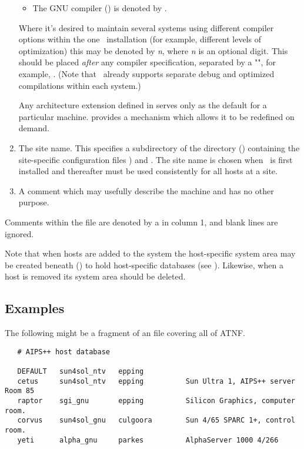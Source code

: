 \begin{enumerate}
\begin{itemize}
   \item
      The GNU compiler () is denoted by .

   \end{itemize}

   Where it's desired to maintain several systems using different compiler
   options within the one \aipspp\ installation (for example, different
   levels of optimization) this may be denoted by \textit{n}, where
   \textit{n} is an optional digit.  This should be placed {\em after} any
   compiler specification, separated by a "\code{-}", for example,
   .  (Note that \aipspp\ already supports separate
   debug and optimized compilations within each system.)

   Any architecture extension defined in  serves only as the
   default for a particular machine.   provides a mechanism
   which allows it to be redefined on demand.

\item
   The site name.  This specifies a subdirectory of the 
   directory () containing the site-specific configuration
   files ) and .  The site name is chosen when
   \aipspp\ is first installed and thereafter must be used consistently for
   all hosts at a site.

\item
   A comment which may usefully describe the machine and has no other purpose.

\end{enumerate}

\noindent
Comments within the  file are denoted by a \code{\#} in column
1, and blank lines are ignored.

Note that when hosts are added to the system the host-specific system area
may be created beneath  () to hold
host-specific databases (see ).  Likewise, when a host is
removed its system area should be deleted.

\subsection*{Examples}

The following might be a fragment of an  file covering all
of ATNF.

\begin{verbatim}
   # AIPS++ host database

   DEFAULT   sun4sol_ntv   epping
   cetus     sun4sol_ntv   epping          Sun Ultra 1, AIPS++ server Room 85
   raptor    sgi_gnu       epping          Silicon Graphics, computer room.
   corvus    sun4sol_gnu   culgoora        Sun 4/65 SPARC 1+, control room.
   yeti      alpha_gnu     parkes          AlphaServer 1000 4/266
\end{verbatim}

